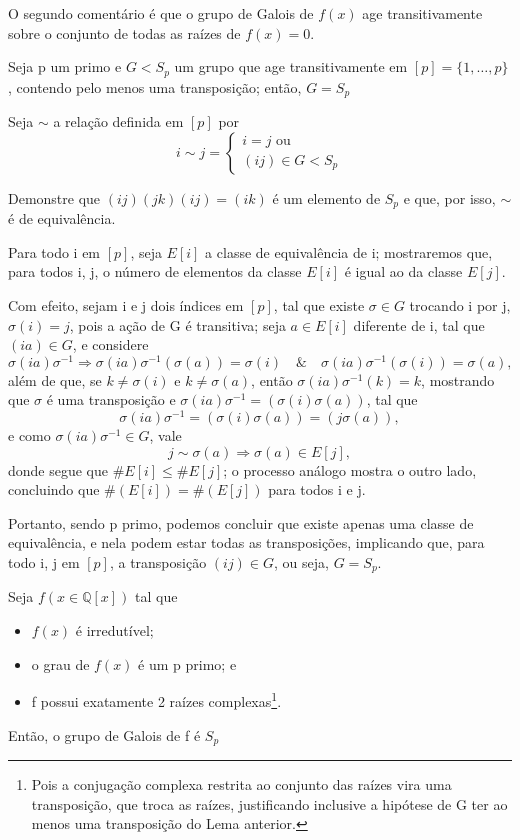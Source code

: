 \documentclass[../algebraIII_notes.tex]{subfiles}
\begin{document}
O segundo comentário é que o grupo de Galois de \(f(x)\) age transitivamente sobre o conjunto de todas as raízes de \(f(x) = 0\).
\begin{lemma*}
	Seja p um primo e \(G < S_p\) um grupo que age transitivamente em \([p]=\{1, \dotsc , p\}\), contendo pelo menos uma transposição; então, \(G=S_p\)
\end{lemma*}
\begin{proof*}
	Seja \(\sim\) a relação definida em \([p]\) por
	\[
		i\sim j = \left\{\begin{array}{ll}
			i=j \text{ ou} \\
			(ij)\in G < S_p
		\end{array}\right.
	\]
	\begin{exr}
		Demonstre que \((ij)(jk)(ij)=(ik)\) é um elemento de \(S_p\) e que, por isso, \(\sim\) é de equivalência.
	\end{exr}
	Para todo i em \([p]\), seja \(E[i]\) a classe de equivalência de i; mostraremos que, para todos i, j, o número de elementos da classe \(E[i]\) é igual ao da classe \(E[j]\).

	Com efeito, sejam i e j dois índices em \([p]\), tal que existe \(\sigma \in G\) trocando i por j, \(\sigma (i) = j\), pois a ação de G é transitiva; seja \(a\in E[i]\) diferente de i, tal que \((ia)\in G\), e considere
	\[
		\sigma (ia)\sigma^{-1} \Rightarrow \sigma(ia)\sigma^{-1}(\sigma(a)) = \sigma (i) \quad\&\quad \sigma(ia)\sigma^{-1}(\sigma(i))=\sigma(a),
	\]
	além de que, se \(k\neq \sigma (i)\) e \(k\neq \sigma (a)\), então \(\sigma(ia)\sigma^{-1}(k) = k\), mostrando que \(\sigma \) é uma transposição e \(\sigma (ia)\sigma^{-1}=(\sigma (i)\sigma(a))\), tal que
	\[
		\sigma (ia)\sigma^{-1}=(\sigma (i)\sigma (a))=(j\sigma (a)),
	\]
	e como \(\sigma(ia)\sigma^{-1}\in G\), vale
	\[
		j\sim \sigma (a) \Rightarrow \sigma (a)\in E[j],
	\]
	donde segue que \(\#E[i]\leq \#E[j]\); o processo análogo mostra o outro lado, concluindo que \(\#(E[i])=\#(E[j])\) para todos i e j.

	Portanto, sendo p primo, podemos concluir que existe apenas uma classe de equivalência, e nela podem estar todas as transposições, implicando que, para todo i, j em \([p]\), a transposição \((ij)\in G\), ou seja, \(G = S_p\). \qedsymbol
\end{proof*}
\begin{lemma*}
	Seja \(f(x\in \mathbb{Q}[x])\) tal que
	\begin{itemize}
		\item[a)] \(f(x)\) é irredutível;
		\item[b)] o grau de \(f(x)\) é um p primo; e
		\item[c)] f possui exatamente 2 raízes complexas\footnote{Pois a conjugação complexa restrita ao conjunto das raízes vira uma transposição, que troca as raízes, justificando inclusive a hipótese de G ter ao menos uma transposição do Lema anterior.}.
	\end{itemize}
	Então, o grupo de Galois de f é \(S_p\)
\end{lemma*}
\end{document}
